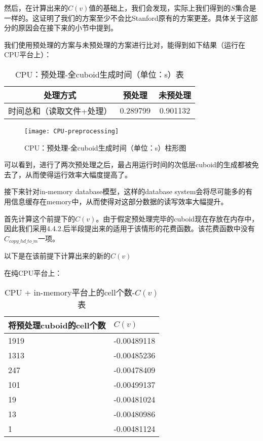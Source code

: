 然后，在计算出来的$C(v)$值的基础上，我们会发现，实际上我们得到的$S$集合是一样的。这证明了我们的方案至少不会比Stanford原有的方案更差。具体关于这部分的原因会在接下来的小节中提到。

我们使用预处理的方案与未预处理的方案进行比对，能得到如下结果（运行在CPU平台上）：

\begin{table}[!htbp]
\centering
\caption{CPU：预处理-全cuboid生成时间（单位：s）表} 
\label{tab:table15}
\begin{tabular}{|c|c|c|}
    \hline
    处理方式 & 预处理 & 未预处理\\
    \hline
    时间总和（读取文件+处理） & 0.289799 & 0.901132\\
    \hline
\end{tabular}
\end{table}

\begin{figure}[ht]
\centering
\texttt{[image: CPU-preprocessing]}
\caption{CPU：预处理-全cuboid生成时间（单位：s）柱形图} 
\label{fig:figure7}
\end{figure}

可以看到，进行了两次预处理之后，最占用运行时间的次低层cuboid的生成都被免去了，从而使得运行效率大幅度提高了。

接下来针对in-memory database模型，这样的database system会将尽可能多的有用信息缓存在memory中，从而使得对这部分数据的读写效率大幅提升。

首先计算这个前提下的$C(v)$。由于假定预处理完毕的cuboid现在存放在内存中，因此我们采用4.4.2.后半段提出来的适用于该情形的花费函数。该花费函数中没有$C_{copy\_hd\_to\_m}$一项。

以下是在该前提下计算出来的新的$C(v)$

在纯CPU平台上：

\begin{table}[!htbp]
\centering
\caption{CPU + in-memory平台上的cell个数-$C(v)$表} 
\label{tab:table16}
\begin{tabular}{|l|l|}
    \hline
    将预处理cuboid的cell个数 & $C(v)$\\
    \hline
    1919 & -0.00489118\\
    \hline
    1313 & -0.00485236\\
    \hline
    247 & -0.00478409\\
    \hline
    101 & -0.00499137\\
    \hline
    19 & -0.00481024\\
    \hline
    13 & -0.00480986\\
    \hline
    1 & -0.00481124\\
    \hline
\end{tabular}
\end{table}

